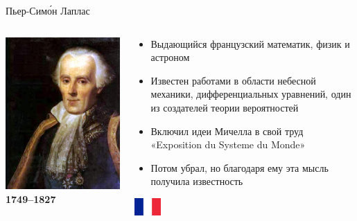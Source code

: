 \documentclass[usenames,dvipsnames,pdftex,unicode,hidelinks]{beamer}
\begin{document}
  \begin{frame}{Пьер-Сим\'{о}н Лаплас}
    \begin{columns}[t]
      \begin{column}{0.25\textwidth}
        \begin{center}
          \includegraphics[width=\textwidth]{laplace}\\
          \textbf{1749--1827}
        \end{center}
      \end{column}
      \begin{column}{0.75\textwidth}
        \begin{itemize}
          \item<1-> Выдающийся французский математик, физик и астроном
          \item<2-> Известен работами в области небесной механики, дифференциальных уравнений, один из создателей теории вероятностей
          \item<3-> \alert{Включил идеи Мичелла} в свой труд «Exposition du Systeme du Monde»
          \item<4-> Потом убрал, но благодаря ему эта мысль \alert{получила известность}
        \end{itemize}
        \begin{center}
          \includegraphics[width=1cm]{france}
        \end{center}
      \end{column}
    \end{columns}
  \end{frame}
\end{document}

